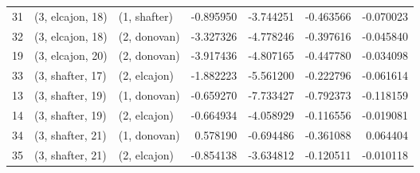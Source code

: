 \begin{tabular}{lllrrrr}
31 &  (3, elcajon, 18) &     (1, shafter) & -0.895950 &  -3.744251 &  -0.463566 & -0.070023 \\
32 &  (3, elcajon, 18) &     (2, donovan) & -3.327326 &  -4.778246 &  -0.397616 & -0.045840 \\
19 &  (3, elcajon, 20) &     (2, donovan) & -3.917436 &  -4.807165 &  -0.447780 & -0.034098 \\
33 &  (3, shafter, 17) &     (2, elcajon) & -1.882223 &  -5.561200 &  -0.222796 & -0.061614 \\
13 &  (3, shafter, 19) &     (1, donovan) & -0.659270 &  -7.733427 &  -0.792373 & -0.118159 \\
14 &  (3, shafter, 19) &     (2, elcajon) & -0.664934 &  -4.058929 &  -0.116556 & -0.019081 \\
34 &  (3, shafter, 21) &     (1, donovan) &  0.578190 &  -0.694486 &  -0.361088 &  0.064404 \\
35 &  (3, shafter, 21) &     (2, elcajon) & -0.854138 &  -3.634812 &  -0.120511 & -0.010118 \\
\bottomrule
\end{tabular}
